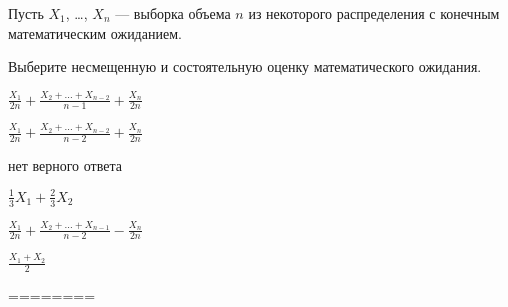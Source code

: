 
\begin{question}
Пусть \(X_1\), \ldots, \(X_n\) --- выборка объема \(n\) из некоторого
распределения с конечным математическим ожиданием.

Выберите несмещенную и состоятельную оценку математического ожидания.
\begin{answerlist}
  \item \(\frac{X_1}{2 n}+\frac{X_2+\ldots+X_{n-2}}{n-1}+\frac{X_n}{2 n}\)
  \item \(\frac{X_1}{2 n}+\frac{X_2+\ldots+X_{n-2}}{n-2}+\frac{X_n}{2 n}\)
  \item нет верного ответа
  \item \(\frac{1}{3} X_1 + \frac{2}{3} X_2\)
  \item \(\frac{X_1}{2 n}+\frac{X_2+\ldots+X_{n-1}}{n-2}-\frac{X_n}{2 n}\)
  \item \(\frac{X_1+X_2}{2}\)
\end{answerlist}
\end{question}

\begin{solution}
========
\end{solution}

